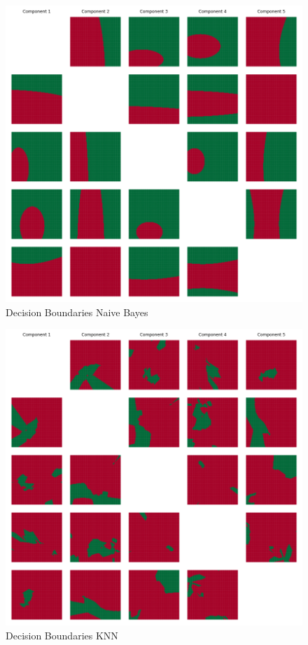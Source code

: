 \documentclass{article}
\begin{document}
\begin{figure}[htb]
    \centering
    \includegraphics[width = 1.0\linewidth]{Naive Bayes_classification.png}
    \caption{Decision Boundaries Naive Bayes}
    \label{fig:NB}
\end{figure}
    
\begin{figure}[htb]
    \centering
    \includegraphics[width = 1.0\linewidth]{KNN_classification.png}
    \caption{Decision Boundaries KNN}
\end{figure}
\end{document}
